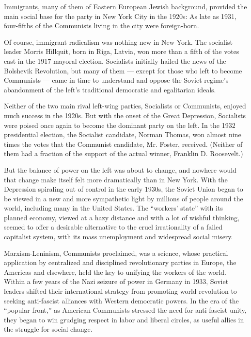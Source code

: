 Immigrants, many of them of Eastern European Jewish background, provided
the main social base for the party in New York City in the 1920s: As
late as 1931, four-fifths of the Communists living in the city were
foreign-born.

Of course, immigrant radicalism was nothing new in New York. The
socialist leader Morris Hillquit, born in Riga, Latvia, won more than a
fifth of the votes cast in the 1917 mayoral election. Socialists
initially hailed the news of the Bolshevik Revolution, but many of them
--- except for those who left to become Communists --- came in time to
understand and oppose the Soviet regime's abandonment of the left's
traditional democratic and egalitarian ideals.

Neither of the two main rival left-wing parties, Socialists or
Communists, enjoyed much success in the 1920s. But with the onset of the
Great Depression, Socialists were poised once again to become the
dominant party on the left. In the 1932 presidential election, the
Socialist candidate, Norman Thomas, won almost nine times the votes that
the Communist candidate, Mr. Foster, received. (Neither of them had a
fraction of the support of the actual winner, Franklin D. Roosevelt.)

But the balance of power on the left was about to change, and nowhere
would that change make itself felt more dramatically than in New York.
With the Depression spiraling out of control in the early 1930s, the
Soviet Union began to be viewed in a new and more sympathetic light by
millions of people around the world, including many in the United
States. The ``workers' state'' with its planned economy, viewed at a
hazy distance and with a lot of wishful thinking, seemed to offer a
desirable alternative to the cruel irrationality of a failed capitalist
system, with its mass unemployment and widespread social misery.

Marxism-Leninism, Communists proclaimed, was a science, whose practical
application by centralized and disciplined revolutionary parties in
Europe, the Americas and elsewhere, held the key to unifying the workers
of the world. Within a few years of the Nazi seizure of power in Germany
in 1933, Soviet leaders shifted their international strategy from
promoting world revolution to seeking anti-fascist alliances with
Western democratic powers. In the era of the ``popular front,'' as
American Communists stressed the need for anti-fascist unity, they began
to win grudging respect in labor and liberal circles, as useful allies
in the struggle for social change.

